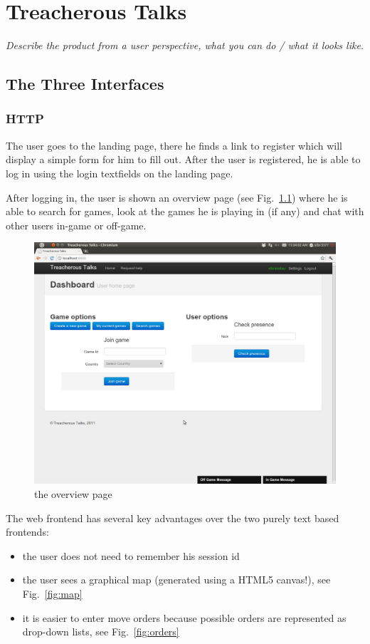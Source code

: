 \documentclass[11pt,a4paper]{report}
\newcommand{\hi}[1]{{\color{red}\em #1\/}\\}
\begin{document}
\chapter{Treacherous Talks}
\hi{Describe the product from a user perspective, what you can do / what it looks like.}
\section{The Three Interfaces}
\subsection{HTTP}
The user goes to the landing page, there he finds a link to register which will
display a simple form for him to fill out. After the user is registered, he is
able to log in using the login textfields on the landing page.

After logging in, the user is shown an overview page (see Fig.~\ref{fig:overview})
 where he is able to search for games, look at the games he is playing in (if any) and
chat with other users in-game or off-game.

\begin{figure}[h]
 \centering
 \includegraphics[width=\textwidth]{./graphics/overviewpage.png}
 \caption{the overview page}
 \label{fig:overview}
\end{figure}

The web frontend has several key advantages over the two purely text based
frontends:
\begin{itemize}
\item the user does not need to remember his session id
\item the user sees a graphical map (generated using a HTML5 canvas!),
  see Fig.~\ref{fig:map}
\item it is easier to enter move orders because possible orders are represented
  as drop-down lists, see Fig.~\ref{fig:orders}
\end{itemize}
\end{document}
